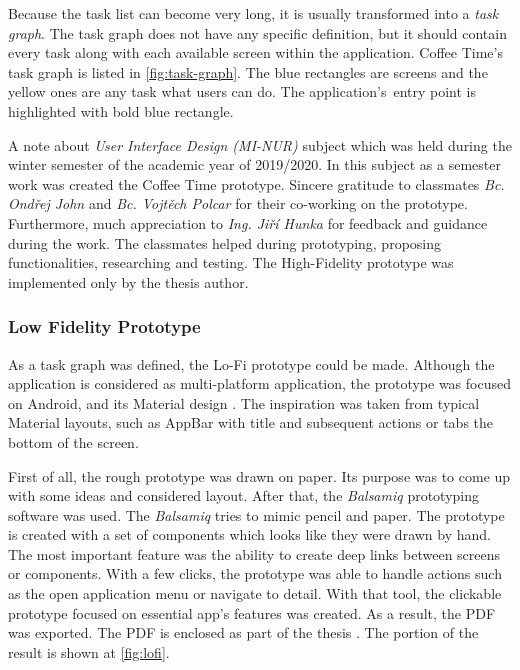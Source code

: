 Because the task list can become very long, it is usually transformed into a \textit{task graph}. The task graph does not have any specific definition, but it should contain every task along with each available screen within the application. Coffee Time's task graph is listed in \cref{fig:task-graph}. The blue rectangles are screens and the yellow ones are any task what users can do. The application's~entry point is highlighted with bold blue rectangle.

A note about \textit{User Interface Design (MI-NUR)} subject which was held during the winter semester of the academic year of 2019/2020. In this subject as a semester work was created the Coffee Time prototype. Sincere gratitude to classmates \textit{Bc. Ondřej John} and \textit{Bc. Vojtěch Polcar} for their co-working on the prototype. Furthermore, much appreciation to \textit{Ing. Jiří Hunka} for feedback and guidance during the work. The classmates helped during prototyping, proposing functionalities, researching and testing. The High-Fidelity prototype was implemented only by the thesis author. 

\subsubsection{Low Fidelity Prototype}
As a task graph was defined, the Lo-Fi prototype could be made. Although the application is considered as multi-platform application, the prototype was focused on Android, and its Material design \cite{material-design}. The inspiration was taken from typical Material layouts, such as AppBar with title and subsequent actions or tabs the bottom of the screen. 

First of all, the rough prototype was drawn on paper. Its purpose was to come up with some ideas and considered layout. After that, the \textit{Balsamiq} \cite{balsamiq} prototyping software was used. The \textit{Balsamiq} tries to mimic pencil and paper. The prototype is created with a set of components which looks like they were drawn by hand.
The most important feature was the ability to create deep links between screens or components. With a few clicks, the prototype was able to handle actions such as the open application menu or navigate to detail. With that tool, the clickable prototype focused on essential app's features was created. As a result, the PDF was exported. The PDF is enclosed as part of the thesis . The portion of the result is shown at \cref{fig:lofi}.

